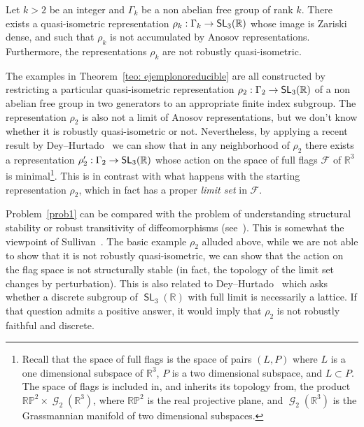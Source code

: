\documentclass[AHL,Unicode,longabstracts]{cedram}
\DeclareMathOperator{\SL}{\mathsf{SL}}
\DeclareMathOperator{\Gr}{\mathcal{G}}
\newcommand{\F}{\mathcal{F}}
\newcommand{\R}{\mathbb{R}}
\newcommand{\RR}{\R}
\newcommand{\RP}{{\RR\mathbb{P}}}
\renewcommand*{\to}{\mathchoice{\longrightarrow}{\rightarrow}{\rightarrow}{\rightarrow}}
\newcommand{\RR}{\mathbb{R}}
\begin{document}
\begin{theo}\label{teo: ejemplonoreducible}
Let $k>2$ be an integer and $\Gamma_k$ be a non abelian free group of rank $k$. There exists a quasi-isometric representation $\rho_k:\Gamma_k \to \SL_3(\R)$ whose image is Zariski dense, and such that $\rho_k$ is not accumulated by Anosov representations. Furthermore, the representations $\rho_k$ are not robustly quasi-isometric.
\end{theo}


The examples in Theorem~\ref{teo: ejemplonoreducible} are all constructed by restricting a particular quasi-isometric representation $\rho_2:\Gamma_2\to\SL_3(\R)$ of a non abelian free group in two generators to an appropriate finite index subgroup. The representation $\rho_2$ is also not a limit of Anosov representations, but we don't know whether it is robustly quasi-isometric or not. Nevertheless, by applying a recent result by Dey--Hurtado~\cite{DeyHurfulllimit} we can show that in any neighborhood of
$\rho_2$ there exists a representation $\rho_2':\Gamma_2\to\SL_3(\R)$ whose action on the space of full flags $\F$ of $\R^3$ is minimal\footnote{Recall that the space of full flags is the space of pairs
$(L,P)$ where $L$ is a one dimensional subspace of $\R^3$, $P$ is a two dimensional subspace, and $L \subset P$. The space of flags is included in, and inherits its topology from, the product $\RP^2 \times \Gr_2(\R^3)$, where $\RP^2$ is the real projective plane, and $\Gr_2(\R^3)$ is the Grassmannian manifold of two dimensional subspaces.}. This is in contrast with what happens with the starting representation $\rho_2$, which in fact has a proper \emph{limit set} in $\F$.



Problem~\ref{prob1} can be compared with the problem of understanding structural stability or robust transitivity of diffeomorphisms (see~\cite[Section~4.4]{BPS}). This is somewhat the viewpoint of Sullivan~\cite{sullivan}. The basic example $\rho_2$ alluded above, while we are not able to show that it is not robustly quasi-isometric, we can show that the action on the flag space is not structurally stable (in fact, the topology of the limit set changes by perturbation). This is also related to Dey--Hurtado~\cite[Question~1.1]{DeyHurfulllimit} which asks whether a discrete subgroup of $\SL_3(\R)$ with full limit is necessarily a lattice. If that question admits a positive answer, it would imply that $\rho_2$ is not robustly faithful and discrete.
\end{document}

